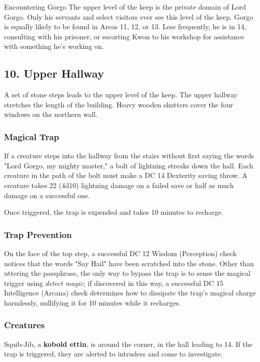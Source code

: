 \documentclass[10pt,a4paper,twoside,bg=print,twocolumn,openany,nodeprecatedcode]{dndbook}
\begin{document}
\begin{DndSidebar}[float=!b]{Encountering Gorgo}
The upper level of the keep is the private domain of Lord Gorgo. Only his servants and select visitors ever see this level of the keep. Gorgo is equally likely to be found in Areas 11, 12, or 13. Less frequently, he is in 14, consulting with his prisoner, or escorting Kwon to his workshop for assistance with something he's working on.



\end{DndSidebar}

\subsection{10. Upper Hallway}
A set of stone steps leads to the upper level of the keep. The upper hallway stretches the length of the building. Heavy wooden shutters cover the four windows on the northern wall.

\subsubsection{Magical Trap}
If a creature steps into the hallway from the stairs without first saying the words "Lord Gorgo, my mighty master," a bolt of lightning streaks down the hall. Each creature in the path of the bolt must make a DC 14 Dexterity saving throw. A creature takes 22 (4d10) lightning damage on a failed save or half as much damage on a successful one.

Once triggered, the trap is expended and takes 10 minutes to recharge.

\subsubsection{Trap Prevention}
On the face of the top step, a successful DC 12 Wisdom (Perception) check notices that the words "Say Hail" have been scratched into the stone. Other than uttering the passphrase, the only way to bypass the trap is to sense the magical trigger using \textit{detect magic}; if discovered in this way, a successful DC 15 Intelligence (Arcana) check determines how to dissipate the trap's magical charge harmlessly, nullifying it for 10 minutes while it recharges.

\subsubsection{Creatures}
Squib-Jib, a \textbf{kobold ettin}, is around the corner, in the hall leading to 14. If the trap is triggered, they are alerted to intruders and come to investigate.
\end{document}
